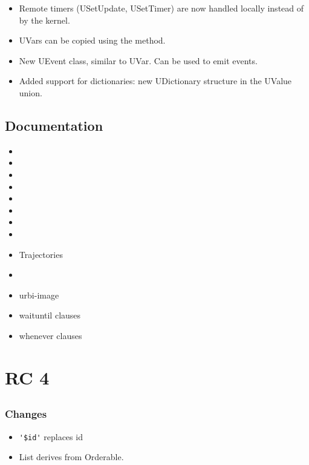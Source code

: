 \begin{itemize}
\item Remote timers (USetUpdate, USetTimer) are now handled locally
  instead of by the kernel.
\item UVars can be copied using the  method.
\item New UEvent class, similar to UVar. Can be used to emit events.
\item Added support for dictionaries: new UDictionary structure in the
  UValue union.
\end{itemize}

\subsection{Documentation}

\begin{itemize}
\item {}
\item {}
\item {}
\item {}
\item {}
\item {}
\item {}
\item {}
\item Trajectories
\item {}
\item urbi-image
\item waituntil clauses
\item whenever clauses
\end{itemize}

\section{ RC 4}

\subsection{\us}
\subsubsection{Changes}

\begin{itemize}
\item \lstinline|'$id'| replaces id
\item List derives from Orderable.
\end{itemize}


